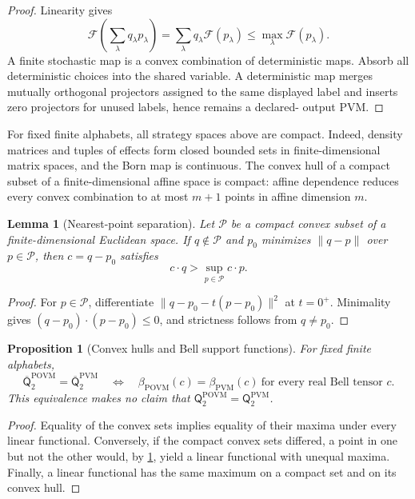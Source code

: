 \documentclass[11pt]{article}
\newtheorem{lemma}[theorem]{Lemma}
\newtheorem{proposition}[theorem]{Proposition}
\theoremstyle{definition}
\newcommand{\Qset}{\mathsf Q}
\newcommand{\Qbar}{\overline{\mathsf Q}}
\newcommand{\POVM}{\mathrm{POVM}}
\newcommand{\PVM}{\mathrm{PVM}}
\newcommand{\cP}{\mathcal P}
\begin{document}
\begin{proof}
Linearity gives
\[
\mathcal F\!\left(\sum_\lambda q_\lambda p_\lambda\right)
=\sum_\lambda q_\lambda\mathcal F(p_\lambda)
\le\max_\lambda\mathcal F(p_\lambda).
\]
A finite stochastic map is a convex combination of deterministic maps.
Absorb all deterministic choices into the shared variable. A deterministic
map merges mutually orthogonal projectors assigned to the same displayed
label and inserts zero projectors for unused labels, hence remains a declared-
output PVM.
\end{proof}

For fixed finite alphabets, all strategy spaces above are compact. Indeed,
density matrices and tuples of effects form closed bounded sets in
finite-dimensional matrix spaces, and the Born map is continuous. The convex
hull of a compact subset of a finite-dimensional affine space is compact:
affine dependence reduces every convex combination to at most \(m+1\) points
in affine dimension \(m\).

\begin{lemma}[Nearest-point separation]
\label{lem:nearest}
Let \(\cP\) be a compact convex subset of a finite-dimensional Euclidean
space. If \(q\notin\cP\) and \(p_0\) minimizes \(\|q-p\|\) over \(p\in\cP\),
then \(c=q-p_0\) satisfies
\[
c\cdot q>\sup_{p\in\cP}c\cdot p.
\]
\end{lemma}

\begin{proof}
For \(p\in\cP\), differentiate
\(\|q-p_0-t(p-p_0)\|^2\) at \(t=0^+\). Minimality gives
\((q-p_0)\cdot(p-p_0)\le0\), and strictness follows from \(q\ne p_0\).
\end{proof}

\begin{proposition}[Convex hulls and Bell support functions]
\label{prop:support-functions}
For fixed finite alphabets,
\[
\Qbar^{\POVM}_2=\Qbar^{\PVM}_2
\quad\Longleftrightarrow\quad
\beta_{\POVM}(c)=\beta_{\PVM}(c)
\ \text{for every real Bell tensor }c.
\]
This equivalence makes no claim that
\(\Qset^{\POVM}_2=\Qset^{\PVM}_2\).
\end{proposition}

\begin{proof}
Equality of the convex sets implies equality of their maxima under every
linear functional. Conversely, if the compact convex sets differed, a point
in one but not the other would, by \cref{lem:nearest}, yield a linear
functional with unequal maxima. Finally, a linear functional has the same
maximum on a compact set and on its convex hull.
\end{proof}
\end{document}
